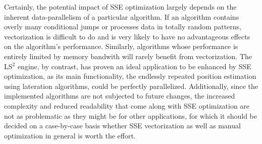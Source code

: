 Certainly, the potential impact of SSE optimization largely depends on the inherent data-parallelism of a particular algorithm. If an algorithm contains overly many conditional jumps or processes data in totally random patterns, vectorization is difficult to do and is very likely to have no advantageous effects on the algorithm's performance. Similarly, algorithms whose performance is entirely limited by memory bandwith will rarely benefit from vectorization. The LS$^{2}$ engine, by contrast, has proven an ideal application to be enhanced by SSE optimization, as its main functionality, the endlessly repeated position estimation using lateration algorithms, could be perfectly parallelized. Additionally, since the implemented algorithms are not subjected to future changes, the increased complexity and reduced readability that come along with SSE optimization are not as problematic as they might be for other applications, for which it should be decided on a case-by-case basis whether SSE vectorization as well as manual optimization in general is worth the effort.

